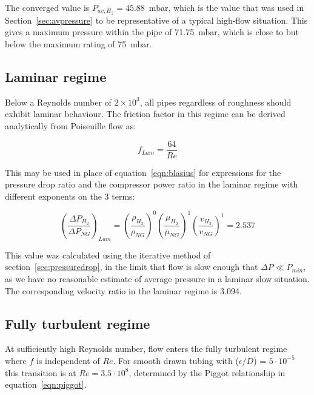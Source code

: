 \documentclass[5p]{elsarticle} %
\begin{document}
The converged value is $P_{av,H_2}=45.88$~mbar, which is the value that was used in Section~\ref{sec:avpressure} to be representative of a typical high-flow situation. 
This gives a maximum pressure within the pipe of 71.75~mbar, which is close to but below the maximum rating of 75~mbar\citep{dodds2013}.

\subsection{Laminar regime}
\label{sec:laminarturbulent}

Below a Reynolds number of $2\times10^3$, all pipes regardless of roughness should exhibit laminar behaviour. 
The friction factor in this regime can be derived analytically from Poiseuille flow as:

\begin{equation}
\label{eqn:flaminar}
    f_{Lam} = \frac{64}{Re}
\end{equation}

This may be used in place of equation~\eqref{eqn:blasius} for  expressions for the pressure drop ratio and the compressor power ratio in the laminar regime with different exponents on the 3 terms:

\begin{equation}
\label{eqn:pdropratiolam}
    \left(\frac{\Delta P_{H_2}}{\Delta P_{NG}}\right)_{Lam} = 
    \left(\frac{\rho_{H_2}}{\rho_{NG}}\right)^{0} 
    \left(\frac{\mu_{H_2}}{\mu_{NG}}\right)^{1} 
    \left(\frac{v_{H_2}}{v_{NG}}\right)^{1} = \mathbf{2.537}
\end{equation}

This value was calculated using the iterative method of section~\ref{sec:pressuredrop}, in the limit that flow is slow enough that  $\Delta P \ll P_{min}$, as we have no reasonable estimate of average pressure in a laminar slow situation. 
The corresponding velocity ratio in the laminar regime is 3.094.

\subsection{Fully turbulent regime}
\label{sec:departure}

At sufficiently high Reynolds number, flow enters the fully turbulent regime where $f$ is independent of $Re$.
For smooth drawn tubing with ($\epsilon/D$) = $5\cdot10^{-5}$ this transition is at $Re = 3.5\cdot10^8$, determined by the Piggot relationship in equation~\eqref{eqn:piggot}. 
\end{document}
